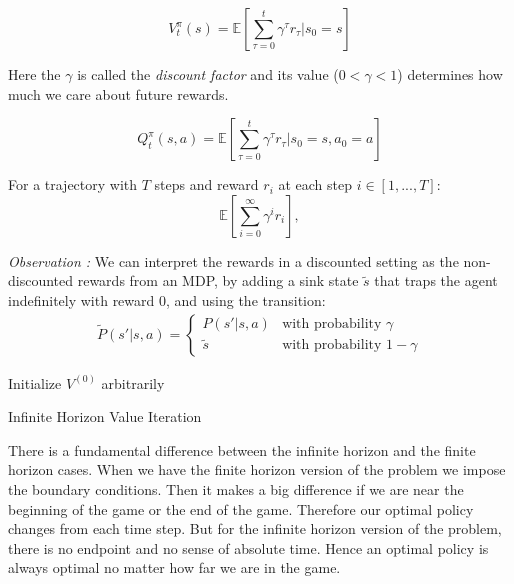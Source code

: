 \documentclass{article}
\begin{document}
\begin{defn}
\[
V^\pi_t(s) = \mathbb{E} \left[ \sum_{\tau=0}^{t}\gamma^\tau r_\tau|s_0=s \right]
\]
\end{defn}
Here the $\gamma$ is called the \textit{discount factor} and its value ($0<\gamma<1$) determines how much we care about future rewards. 
\begin{defn}
\[
Q^\pi_t(s,a) = \mathbb{E} \left[ \sum_{\tau=0}^{t}\gamma^\tau r_\tau|s_0=s,a_0=a \right]
\]
\end{defn}

\begin{defn}
For a trajectory with $T$ steps and reward $r_{i}$ at each step $i \in [1,...,T]$:
\[
\mathbb{E}\left[\sum_{i=0}^{\infty}\gamma^{i}r_{i}\right], 
\]
\end{defn}

\textit{Observation :} We can interpret the rewards in a discounted setting as the non-discounted rewards from an MDP, by adding a sink state $\tilde s$ that traps the agent indefinitely with reward 0, and using the transition:
\begin{equation*}
\begin{split}
    \tilde P(s'|s,a)= 
    \begin{cases}
        P(s'|s,a)
        &
        \text{with probability $\gamma$}
        \\
        \tilde s
        & 
        \text{with probability $1 - \gamma$}
    \end{cases}
\end{split}
\end{equation*}

\begin{algorithm}[H]
Initialize $V^{(0)}$ arbitrarily$\;$

\SetAlgoLined
 \caption{Infinite Horizon Value Iteration}
 \label{alg:infinite_horizon_VI}
\end{algorithm}
There is a fundamental difference between the infinite horizon and the finite horizon cases. When we have the finite horizon version of the problem we impose the boundary conditions. Then it makes a big difference if we are near the beginning of the game or the end of the game. Therefore our optimal policy changes from each time step. But for the infinite horizon version of the problem, there is no endpoint and no sense of absolute time. Hence an optimal policy is always optimal no matter how far we are in the game.
\end{document}

